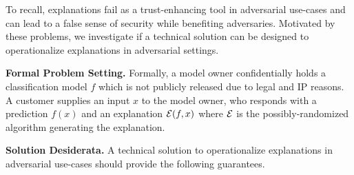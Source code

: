 

To recall, explanations fail as a trust-enhancing tool in adversarial use-cases and can lead to a false sense of security while benefiting adversaries. Motivated by these problems, we investigate if a technical solution can be designed to operationalize explanations in adversarial settings.


\textbf{Formal Problem Setting.} Formally, a model owner confidentially holds a classification model $f$ which is not publicly released due to legal and IP reasons. A customer supplies an input $x$ to the model owner, who responds with a prediction $f(x)$ and an explanation $\mathcal{E}(f,x)$  where $\mathcal{E}$ is the possibly-randomized algorithm generating the explanation. %


\textbf{Solution Desiderata.} A technical solution to operationalize explanations in adversarial use-cases should provide the following guarantees.

